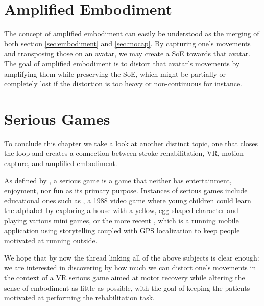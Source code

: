 \section{Amplified Embodiment}

The concept of amplified embodiment can easily be understood as the merging of both section \ref{sec:embodiment} and \ref{sec:mocap}. By capturing one's movements and transposing those on an avatar, we may create a SoE towards that avatar. The goal of amplified embodiment is to distort that avatar's movements by amplifying them while preserving the SoE, which might be partially or completely lost if the distortion is too heavy or non-continuous for instance.

\section{Serious Games}

To conclude this chapter we take a look at another distinct topic, one that closes the loop and creates a connection between stroke rehabilitation, VR, motion capture, and amplified embodiment.

As defined by \cite{djaouti2011classifying,chen2005proof}, a serious game is a game that neither has entertainment, enjoyment, nor fun as its primary purpose. Instances of serious games include educational ones such as \cite{epsitec1988blupi}, a 1988 video game where young children could learn the alphabet by exploring a house with a yellow, egg-shaped character and playing various mini games, or the more recent \cite{six2017zombie}, which is a running mobile application using storytelling coupled with GPS localization to keep people motivated at running outside.

We hope that by now the thread linking all of the above subjects is clear enough: we are interested in discovering by how much we can distort one's movements in the context of a VR serious game aimed at motor recovery while altering the sense of embodiment as little as possible, with the goal of keeping the patients motivated at performing the rehabilitation task.
